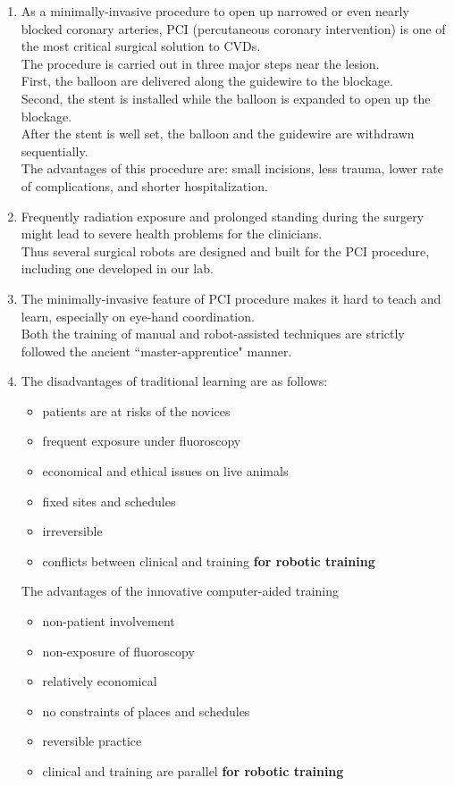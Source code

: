 \documentclass{article}
\begin{document}
\begin{enumerate}
\item As a minimally-invasive procedure to open up narrowed or even nearly blocked coronary arteries, PCI (percutaneous coronary intervention) is one of the most critical surgical solution to CVDs.\\%
      The procedure is carried out in three major steps near the lesion. \\
      First, the balloon are delivered along the guidewire to the blockage. \\
      Second, the stent is installed while the balloon is expanded to open up the blockage. \\
      After the stent is well set, the balloon and the guidewire are withdrawn sequentially. \\
      The advantages of this procedure are: small incisions, less trauma, lower rate of complications, and shorter hospitalization.

\item Frequently radiation exposure and prolonged standing during the surgery might lead to severe health problems for the clinicians. \\
      Thus several surgical robots are designed and built for the PCI procedure, including one developed in our lab.

\item The minimally-invasive feature of PCI procedure makes it hard to teach and learn, especially on eye-hand coordination. \\
      Both the training of manual and robot-assisted techniques are strictly followed the ancient ``master-apprentice" manner.

\item The disadvantages of traditional learning are as follows:
      \begin{itemize}
      \item patients are at risks of the novices
      \item frequent exposure under fluoroscopy
      \item economical and ethical issues on live animals
      \item fixed sites and schedules
      \item irreversible
      \item conflicts between clinical and training \textbf{for robotic training}
      \end{itemize}

      The advantages of the innovative computer-aided training
      \begin{itemize}
      \item non-patient involvement
      \item non-exposure of fluoroscopy
      \item relatively economical
      \item no constraints of places and schedules
      \item reversible practice
      \item clinical and training are parallel \textbf{for robotic training}
      \end{itemize}


\end{enumerate}
\end{document}

